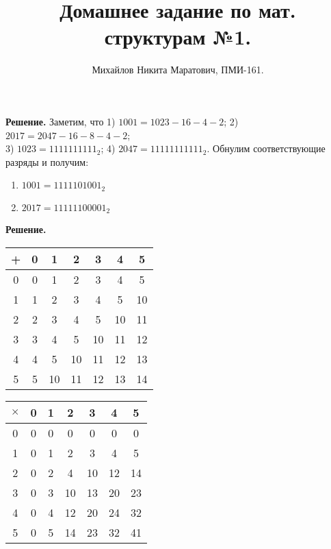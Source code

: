 \documentclass[a4paper, 12pt]{article}
\title{
	Домашнее задание по мат. структурам №1.
}
\author{Михайлов Никита Маратович, ПМИ-161.
}
\date{}
\begin{document}
\maketitle
\begin{spacing}{1}
		
\begin{center}
\end{center}
\textbf{Решение.} Заметим, что 1) $1001 = 1023 - 16 - 4 - 2$; 2) $2017 = 2047 - 16 - 8 - 4 - 2$; \\3) $1023 = 1111111111_2$; 
4) $2047 = 11111111111_2$. Обнулим соответствующие разряды и получим:
\begin{enumerate}
	\item $1001 = 1111101001_2$
	\item $2017 = 11111100001_2$
\end{enumerate}


\begin{center}
\end{center}
\textbf{Решение.}\\[10pt]
\begin{minipage}[c]{100mm}
	\begin{tabular}{| c | c | c | c | c | c | c |}
		\hline
		+ & 0 & 1 & 2 & 3 & 4 & 5 \\
		\hline
		0 & 0 & 1 & 2 & 3 & 4 & 5 \\ 
		\hline
		1 & 1 & 2 & 3 & 4 & 5 & 10 \\ 
		\hline
		2 & 2 & 3 & 4 & 5 & 10 & 11 \\ 
		\hline
		3 & 3 & 4 & 5 & 10 & 11 & 12 \\ 
		\hline
		4 & 4 & 5 & 10 & 11 & 12 & 13 \\ 
		\hline
		5 & 5 & 10 & 11 & 12 & 13 & 14 \\ 
		\hline
	\end{tabular}
\end{minipage}
\begin{minipage}[c]{100mm}
	\begin{tabular}{| c | c | c | c | c | c | c |}
		\hline
		$\times$ & 0 & 1 & 2 & 3 & 4 & 5 \\
		\hline
		0 & 0 & 0 & 0 & 0 & 0 & 0 \\ 
		\hline
		1 & 0 & 1 & 2 & 3 & 4 & 5 \\ 
		\hline
		2 & 0 & 2 & 4 & 10 & 12 & 14 \\ 
		\hline
		3 & 0 & 3 & 10 & 13 & 20 & 23 \\ 
		\hline
		4 & 0 & 4 & 12 & 20 & 24 & 32 \\ 
		\hline
		5 & 0 & 5 & 14 & 23 & 32 & 41 \\ 
		\hline
	\end{tabular}
\end{minipage}
\\


\end{spacing}
\end{document}

